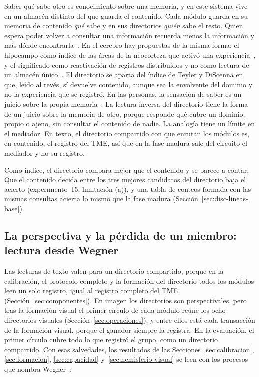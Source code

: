 Saber qué sabe otro es conocimiento sobre una memoria, y en este sistema vive en un
almacén distinto del que guarda el contenido.
Cada módulo guarda en su memoria de contenido \emph{qué} sabe y en sus directorios
\emph{quién} sabe el resto.
Quien espera poder volver a consultar una información recuerda menos la información
y más dónde encontrarla~\cite{sparrow2011google}.
En el cerebro hay propuestas de la misma forma: el hipocampo como índice de las
áreas de la neocorteza que activó una experiencia~\cite{teyler1986hippocampal}, y el
significado como reactivación de registros distribuidos y no como lectura de un
almacén único~\cite{damasio1989time}.
El directorio se aparta del índice de Teyler y DiScenna en que, leído al revés, sí
devuelve contenido, aunque sea la envolvente del dominio y no la experiencia que se
registró.
En las personas, la sensación de saber es un juicio sobre la propia
memoria~\cite{hart1965memory}.
La lectura inversa del directorio tiene la forma de un juicio sobre la memoria de otro,
porque responde qué cubre un dominio, propio o ajeno, sin consultar el contenido de
nadie.
La analogía tiene un límite en el mediador.
En texto, el directorio compartido con que enrutan los módulos es, en contenido, el
registro del TME, así que en la fase madura sale del circuito el mediador y no su
registro.

Como índice, el directorio compara mejor que el contenido y se parece a contar.
Que el contenido decida entre los tres mejores candidatos del directorio baja el acierto
(experimento~15; limitación (a)), y una tabla de conteos formada con las mismas
consultas acierta lo mismo que la fase madura (Sección~\ref{sec:disc-lineas-base}).

\subsection{La perspectiva y la pérdida de un miembro: lectura desde Wegner}
\label{sec:disc-wegner}

Las lecturas de texto valen para un directorio compartido, porque en la
calibración, el protocolo completo y la formación del directorio todos los módulos leen
un solo registro, igual al registro completo del TME (Sección~\ref{sec:componentes}).
En imagen los directorios son perspectivales, pero tras la formación visual el primer
círculo de cada módulo reúne los ocho directorios visuales
(Sección~\ref{sec:operaciones}), y entre ellos está cada transacción de la formación
visual, porque el ganador siempre la registra.
En la evaluación, el primer círculo cubre todo lo que registró el grupo, como un
directorio compartido.
Con esas salvedades, los resultados de las Secciones~\ref{sec:calibracion},
\ref{sec:formacion}, \ref{sec:capacidad} y~\ref{sec:hemisferio-visual} se leen con los
procesos que nombra Wegner~\cite{wegner1995computer}:

